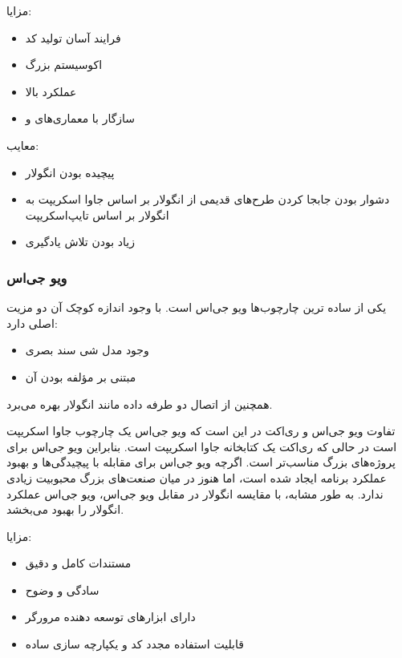 مزایا:
\begin{itemize}
    \item فرایند آسان تولید کد
    \item اکوسیستم بزرگ
    \item عملکرد بالا
    \item سازگار با معماری‌های  و 
\end{itemize}


معایب:

\begin{itemize}
    \item پیچیده بودن انگولار
    \item دشوار بودن جابجا کردن طرح‌های قدیمی از انگولار بر اساس جاوا اسکریپت به انگولار بر اساس تایپ‌اسکریپت
    \item زیاد بودن تلاش یادگیری
\end{itemize}


\newpage

\subsubsection{ویو جی‌اس}

یکی از ساده ترین چارچوب‌ها ویو جی‌اس است. با وجود اندازه کوچک آن دو مزیت اصلی دارد:

\begin{itemize}
    \item وجود مدل شی سند بصری
    \item مبتنی بر مؤلفه بودن آن 
\end{itemize}
همچنین از اتصال دو طرفه داده مانند انگولار بهره می‌برد.


تفاوت ویو جی‌اس و ری‌اکت در این است که ویو جی‌اس یک چارچوب جاوا اسکریپت است در حالی که ری‌اکت یک کتابخانه جاوا اسکریپت است. بنابراین ویو جی‌اس برای پروژه‌های بزرگ مناسب‌تر است. اگرچه ویو جی‌اس برای مقابله با پیچیدگی‌ها و بهبود عملکرد برنامه ایجاد شده است، اما هنوز در میان صنعت‌های بزرگ محبوبیت زیادی ندارد. به طور مشابه، با مقایسه انگولار در مقابل ویو جی‌اس، ویو جی‌اس عملکرد انگولار را بهبود می‌بخشد.


مزایا:
\begin{itemize}
    \item مستندات کامل و دقیق
    \item سادگی و وضوح
    \item دارای ابزارهای توسعه دهنده مرورگر
    \item قابلیت استفاده مجدد کد و یکپارچه سازی ساده
\end{itemize}

